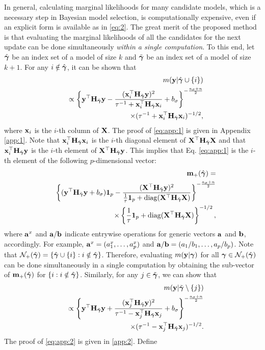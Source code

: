 In general, calculating marginal likelihoods for many candidate models, which is a necessary step in Bayesian model selection, is computationally expensive, even if an explicit form is available as in \eqref{eq:2}. The great merit of the proposed method is that evaluating the marginal likelihoods of all the candidates for the next update can be done simultaneously \emph{within a single computation}. To this end, let $\hat{{\boldsymbol \gamma}}$ be an index set of a model of size $k$ and $\tilde{{\boldsymbol \gamma}}$ be an index set of a model of size $k+1$. For any $i\notin \hat{{\boldsymbol \gamma}}$, it can be shown that
\begin{eqnarray}
 \nonumber&& m({\bf y}|\hat{{\boldsymbol \gamma}}\cup\{i\}) \\
 \nonumber&&\propto \left\{{\bf y}^{{ \top}}{\bf H}_{\hat{{\boldsymbol \gamma}}}{\bf y}-\frac{(
 	{\bf x}_i^{{ \top}}{\bf H}_{\hat{{\boldsymbol \gamma}}}{\bf y})^2}{\tau^{-1}+{\bf x}_i^{{ \top}}{\bf H}_{\hat{{\boldsymbol \gamma}}} {\bf x}_i }+b_{\sigma}\right\}^
 {-\frac{a_{\sigma}+n}{2}} \\
 \label{eq:app:1} & &\quad \times (\tau^{-1}+{\bf x}_i^{{ \top}}{\bf H}_{\hat{{\boldsymbol \gamma}}} {\bf x}_i)^{-1/2},
\end{eqnarray}
where ${\bf x}_i$ is the $i$-th column of ${\bf X}$. The proof of \eqref{eq:app:1} is given in Appendix \ref{app:1}. Note that ${\bf x}_i^{{ \top}}{\bf H}_{\hat{{\boldsymbol \gamma}}}{\bf x}_i$ is the $i$-th diagonal element of ${\bf X}^{{ \top}}{\bf H}_{\hat{{\boldsymbol \gamma}}}{\bf X}$ and that ${\bf x}_i^{{ \top}}{\bf H}_{\hat{{\boldsymbol \gamma}}}{\bf y}$ is the $i$-th element of ${\bf X}^{{ \top}}{\bf H}_{\hat{{\boldsymbol \gamma}}}{\bf y}$. This implies that Eq. \eqref{eq:app:1} is the $i$-th element of the following $p$-dimensional vector:
\begin{eqnarray*}
&&{\bf m}_+({\hat{{\boldsymbol \gamma}}})=\\
&& \left\{({\bf y}^{{ \top}}{\bf H}_{\hat{{\boldsymbol \gamma}}}{\bf y}+b_{\sigma}) {\boldsymbol 1}_p-\frac{({\bf X}^{{ \top}}{\bf H}_{\hat{{\boldsymbol \gamma}}}{\bf y})^2}{\frac{1}{\tau}{\boldsymbol 1}_p+{\rm diag}({\bf X}^{{ \top}}{\bf H}_{\hat{{\boldsymbol \gamma}}}{\bf X}) } \right\}^
 {-\frac{a_{\sigma}+n}{2}}\\
 &&\quad \times\left\{\frac{1}{\tau} {\boldsymbol 1}_p  +{\rm diag}({\bf X}^{{ \top}}{\bf H}_{\hat{{\boldsymbol \gamma}}}{\bf X}) \right\}^{-1/2},
 \end{eqnarray*}
 where ${\bf a}^x$ and ${\bf a}/{\bf b}$ indicate entrywise operations for generic vectors ${\bf a}$ and ${\bf b}$, accordingly. For example, ${\bf a}^x=(a_1^x,\ldots, a_p^x)$ and ${\bf a}/{\bf b}=(a_1/b_1,\ldots,a_p/b_p)$. Note that $\mathcal{N}_+(\hat{{\boldsymbol \gamma}})=\{\hat{{\boldsymbol \gamma}} \cup \{i\}:i\notin \hat{{\boldsymbol \gamma}} \}$. Therefore, evaluating $m({\bf y}|{\boldsymbol \gamma})$ for all ${\boldsymbol \gamma} \in \mathcal{N}_+(\hat{{\boldsymbol \gamma}} )$ can be done simultaneously in a single computation by obtaining the sub-vector of ${\bf m}_+({\hat{{\boldsymbol \gamma}}})$ for $\{i:i\notin \hat{{\boldsymbol \gamma}} \}$. Similarly, for any $j \in\tilde{{\boldsymbol \gamma}}$, we can show that 
 \begin{eqnarray}
 \nonumber&&m({\bf y}|\tilde{{\boldsymbol \gamma}}\setminus \{j\}) \\
 \nonumber &&\propto \left\{{\bf y}^{{ \top}}{\bf H}_{\tilde{{\boldsymbol \gamma}}}{\bf y}+\frac{(
 	{\bf x}_j^{{ \top}}{\bf H}_{\tilde{{\boldsymbol \gamma}}}{\bf y})^2}{\tau^{-1}-{\bf x}_j^{{ \top}}{\bf H}_{\tilde{{\boldsymbol \gamma}}} {\bf x}_j }+b_{\sigma}\right\}^
 {-\frac{a_{\sigma}+n}{2}}\\
\label{eq:app:2}&&\quad \times (\tau^{-1}-{\bf x}_j^{{ \top}}{\bf H}_{\tilde{{\boldsymbol \gamma}}} {\bf x}_j)^{-1/2}.
\end{eqnarray} The proof of \eqref{eq:app:2} is given in \ref{app:2}. Define
